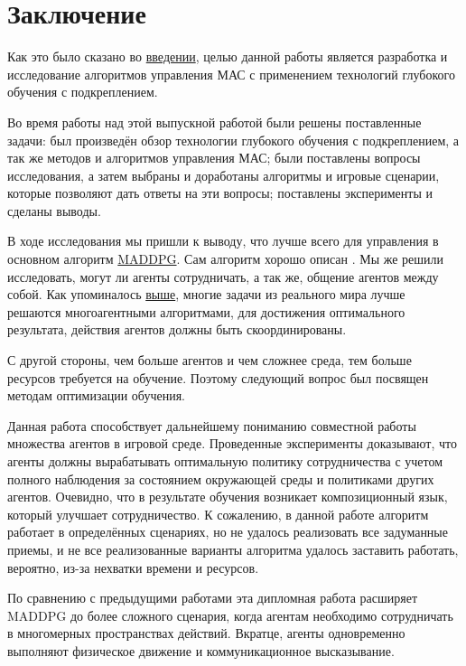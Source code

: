 \chapter*{Заключение} \label{ch-conclusion}

Как это было сказано во \hyperref[intro]{введении}, целью данной работы является разработка и исследование алгоритмов управления МАС с применением технологий глубокого обучения с подкреплением. 

Во время работы над этой выпускной работой были решены поставленные задачи: был произведён обзор технологии глубокого обучения с подкреплением, а так же методов и алгоритмов управления МАС; были поставлены вопросы исследования, а затем выбраны и доработаны алгоритмы и игровые сценарии, которые позволяют дать ответы на эти вопросы; поставлены эксперименты и сделаны выводы.

В ходе исследования мы пришли к выводу, что лучше всего для управления в основном алгоритм \hyperref[acr:maddpg]{MADDPG}. Сам алгоритм хорошо описан \cite{lowe2017multiagent}. Мы же решили исследовать, могут ли агенты сотрудничать, а так же, общение агентов между собой. Как упоминалось \hyperref[ch2:ma-algs]{выше}, многие задачи из реального мира лучше решаются многоагентными алгоритмами, для достижения оптимального результата, действия агентов должны быть скоординированы.

С другой стороны, чем больше агентов и чем сложнее среда, тем больше ресурсов требуется на обучение. Поэтому следующий вопрос был посвящен методам оптимизации обучения.

Данная работа способствует дальнейшему пониманию совместной работы множества агентов в игровой среде. Проведенные эксперименты доказывают, что агенты должны вырабатывать оптимальную политику сотрудничества с учетом полного наблюдения за состоянием окружающей среды и политиками других агентов. Очевидно, что в результате обучения возникает композиционный язык, который улучшает сотрудничество. К сожалению, в данной работе алгоритм работает в определённых сценариях, но не удалось реализовать все задуманные приемы, и не все реализованные варианты алгоритма удалось заставить работать, вероятно, из-за нехватки времени и ресурсов.

По сравнению с предыдущими работами эта дипломная работа расширяет MADDPG до более сложного сценария, когда агентам необходимо сотрудничать в многомерных пространствах действий. Вкратце, агенты одновременно выполняют физическое движение и коммуникационное высказывание.

